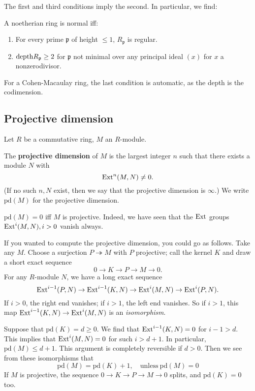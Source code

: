 The first and third conditions imply the second. In particular, we find:

\begin{theorem} A noetherian ring is normal iff:
\begin{enumerate}
\item For every prime $\mathfrak{p}$ of height $\leq 1$, $R_{\mathfrak{p}} $ is regular.
\item  $\mathrm{depth} R_{\mathfrak{p}} \geq 2$ for $\mathfrak{p}$ not minimal over any
principal ideal $(x)$ for $x$ a nonzerodivisor. \end{enumerate}
\end{theorem} 
For a Cohen-Macaulay ring, the last condition is automatic, as the depth is the
codimension.

\subsection{Projective dimension}

\newcommand{\pr}{\mathrm{pd}}
Let $R$ be a commutative ring, $M$ an $R$-module. 

\begin{definition} 
The \textbf{projective dimension} of $M$ is the largest integer $n$ such that
there exists  a module $N$ with
\[ \mathrm{Ext}^n(M,N) \neq 0.  \]
(If no such $n,N$ exist, then we say that the projective dimension is $\infty$.)
We write $\pr(M)$ for the projective dimension.
\end{definition} 

\begin{remark} 
$\pr(M) = 0$ iff $M$ is projective. Indeed, we have seen that the $\mathrm{Ext}$ groups
$\mathrm{Ext}^i(M,N), i >0$
vanish always.
\end{remark} 

If you wanted to compute the projective dimension, you could go as follows.
Take any $M$. Choose a surjection $P \twoheadrightarrow M$ with $P$ projective;
call the kernel $K$ and draw a short exact sequence
\[ 0 \to K \to P \to M \to 0.  \]
For any $R$-module $N$, we have a long exact sequence
\[ \mathrm{Ext}^{i-1}(P,N) \to \mathrm{Ext}^{i-1}(K,N) \to \mathrm{Ext}^i(M,N) \to \mathrm{Ext}^i(P, N).   \]
If $i >0$, the right end vanishes; if $i >1$, the left end vanishes. So if $i
>1$, this map $\mathrm{Ext}^{i-1}(K,N) \to \mathrm{Ext}^i(M,N)$ is an \emph{isomorphism}.

Suppose that $\pr(K) = d \geq 0$. We find that $\mathrm{Ext}^{i-1}(K,N)=0$ for $i-1
> d$.  
This implies that $\mathrm{Ext}^i(M,N) = 0$ for such $i > d+1$. In particular, $\pr(M)
\leq d+1$.
This argument is completely reversible if $d >0$.
Then we see from these isomorphisms that
\[ \boxed{\pr(M) = \pr(K)+1}, \quad \mathrm{unless} \ \pr(M)=0  \]
If $M$ is projective, the sequence $0 \to K \to P \to M \to 0$ splits, and
$\pr(K)=0$ too.

